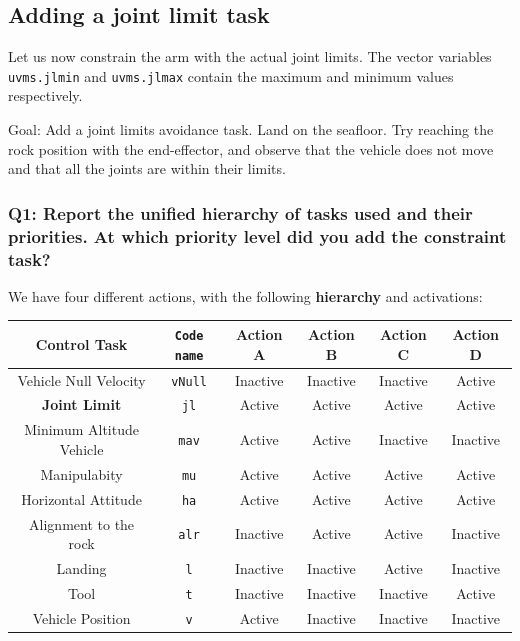 \documentclass{article}
\begin{document}
\clearpage

\subsection{Adding a joint limit task}
Let us now constrain the arm with the actual joint limits. The vector variables \texttt{uvms.jlmin} and \texttt{uvms.jlmax} contain the maximum and minimum values respectively.

Goal: Add a joint limits avoidance task. Land on the seafloor. Try reaching the rock position with the end-effector, and observe that the vehicle does not move and that all the joints are within their limits.

\subsubsection{Q1: Report the unified hierarchy of tasks used and their priorities. At which priority level did you add the constraint task?}
We have four different actions, with the following \textbf{hierarchy} and activations:
\begin{center}
\begin{tabular}{ | c | c | c | c | c | c |}
\hline
 Control Task & \texttt{Code name} & Action A & Action B & Action C & Action D\\
 \hline
 Vehicle Null Velocity & \texttt{vNull} & Inactive & Inactive & Inactive & Active\\
 \textbf{Joint Limit} & \texttt{jl} & Active & Active & Active & Active \\
 Minimum Altitude Vehicle &  \texttt{mav} & Active & Active & Inactive & Inactive \\  
 Manipulabity &  \texttt{mu} & Active & Active & Active & Active  \\
 Horizontal Attitude &  \texttt{ha} & Active & Active & Active & Active\\
 Alignment to the rock & \texttt{alr} & Inactive & Active & Active & Inactive \\
 Landing & \texttt{l} &Inactive & Inactive & Active & Inactive\\
 Tool  &  \texttt{t} & Inactive & Inactive & Inactive & Active\\
 Vehicle Position &  \texttt{v} &Active & Inactive & Inactive & Inactive\\
 \hline
\end{tabular}
\end{center}
\end{document}
